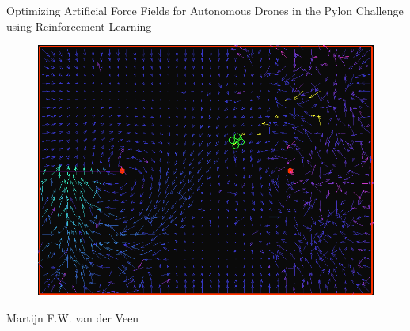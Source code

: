\documentclass[11pt]{article}
\begin{document}

\thispagestyle{empty} %

\vspace{2.5cm}
\begin{center}
\begin{huge}
Optimizing Artificial Force Fields for Autonomous Drones in the Pylon Challenge using Reinforcement Learning
\end{huge}

\vspace{0.5cm}

  \begin{figure}[h!]
    \includegraphics[width=1.0\textwidth]{img/front_image}
  \end{figure}

\vspace{1.5cm}
Martijn F.W. van der Veen

\vspace{1.5cm}

\end{center}



\end{document}
